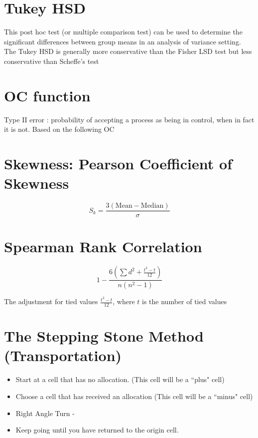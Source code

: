\begin{enumerate}
\section{Tukey HSD}

This post hoc test (or multiple comparison test) can be used to determine the significant differences between group means in an analysis of variance setting. The Tukey HSD is generally more conservative than the Fisher LSD test but less conservative than Scheffe's test





\section{OC function}
Type II error : probability of accepting a process as being in control, when in fact it is not.
Based on the following OC



\section{Skewness: Pearson Coefficient of Skewness}

\[S_k = \frac{3(\mbox{Mean} - \mbox{Median} )}{\sigma} \]




\section{Spearman Rank Correlation}

\[ 1 - \frac{6\left( \sum d^2 + \frac{t^3-t}{12} \right)}{n(n^2-1)} \]

The adjustment for tied values
$ \frac{t^3-t}{12} $, where $t$ is the number of tied values


\section{The Stepping Stone Method (Transportation)}

\begin{itemize}
	\item Start at a cell that has no allocation. (This cell will be a ``plus" cell)
	\item Choose a cell that has received an allocation (This cell will be a ``minus" cell)
	\item Right Angle Turn -
	\item Keep going until you have returned to the origin cell.
\end{itemize}


\end{enumerate}
